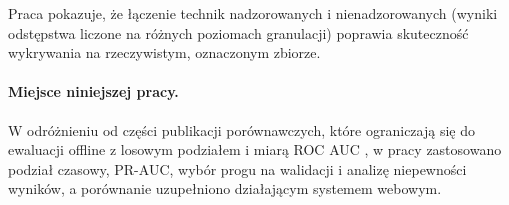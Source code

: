 Praca \cite{carcillo2019} pokazuje, że łączenie technik nadzorowanych i nienadzorowanych (wyniki odstępstwa liczone na różnych poziomach granulacji) poprawia skuteczność wykrywania na rzeczywistym, oznaczonym zbiorze.


\paragraph{Miejsce niniejszej pracy.} W odróżnieniu od części publikacji porównawczych, które ograniczają się do ewaluacji offline z losowym podziałem i miarą ROC AUC \cite{niu2019}, w pracy zastosowano podział czasowy, PR-AUC, wybór progu na walidacji i analizę niepewności wyników, a porównanie uzupełniono działającym systemem webowym.
